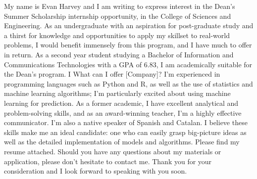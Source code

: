 \cvletter{}

\cvparagraph{}
{My name is Evan Harvey and I am writing to express interest in the Dean's Summer Scholarship internship opportunity, in the College of Sciences and Engineering.}
\cvparagraph{}
{As an undergraduate with an aspiration for post-graduate study and a thirst for knowledge and opportunities to apply my skillset to real-world problems, I would benefit immensely from this program, and I have much to offer in return.}
\cvparagraph{}
{As a second year student studying a Bachelor of Information and Communications Technologies with a GPA of 6.83, I am academically suitable for the Dean's program.
I }
\cvparagraph{}
  {What can I offer [Company]? I’m experienced in programming languages such as Python and R, as well as the use of statistics and machine learning algorithms; I’m particularly excited about using machine learning for prediction. As a former academic, I have excellent analytical and problem-solving skills, and as an award-winning teacher, I’m a highly effective communicator. I’m also a native speaker of Spanish and Catalan. I believe these skills make me an ideal candidate: one who can easily grasp big-picture ideas as well as the detailed implementation of models and algorithms.}
\cvparagraph{}
  {Please find my resume attached. Should you have any questions about my materials or application, please don’t hesitate to contact me.}
\cvparagraph{}
  {Thank you for your consideration and I look forward to speaking with you soon.}
